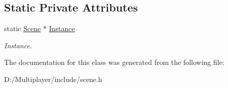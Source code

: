 \subsection*{Static Private Attributes}
\begin{DoxyCompactItemize}
\item 
\mbox{\label{class_scene_a3dee4192d331756bcac00273b46b22bc}} 
static \hyperlink{class_scene}{Scene} $\ast$ \hyperlink{class_scene_a3dee4192d331756bcac00273b46b22bc}{Instance}
\begin{DoxyCompactList}\small\item\em Instance. \end{DoxyCompactList}\end{DoxyCompactItemize}


The documentation for this class was generated from the following file\+:\begin{DoxyCompactItemize}
\item 
D\+:/\+Multiplayer/include/scene.\+h\end{DoxyCompactItemize}
